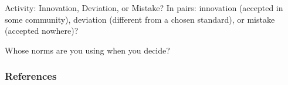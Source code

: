 \documentclass{beamer}
\begin{document}
\begin{frame}{Activity: Innovation, Deviation, or Mistake?}
  \large
  In pairs: innovation (accepted in some community), deviation (different
  from a chosen standard), or mistake (accepted nowhere)?
  \begin{exe}
    \ex {}
    \ex {}
    \ex {}
    \ex {}
    \ex {}
    \ex {}
    \ex {}
    \ex {}
  \end{exe}
  Whose norms are you using when you decide?
\end{frame}

\begin{frame}[allowframebreaks]
  \frametitle{References}
  
  
\end{frame}
\end{document}
